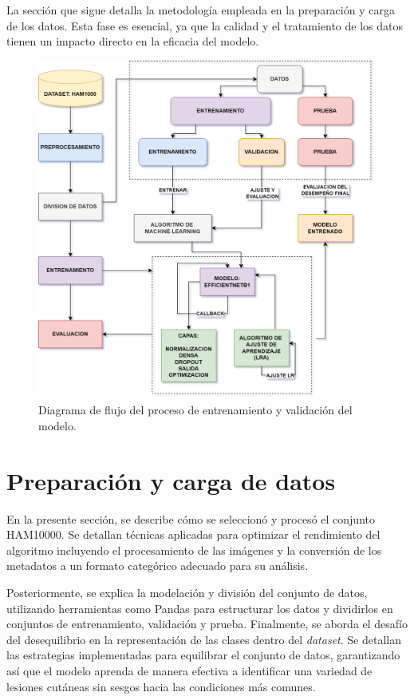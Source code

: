 La sección que sigue detalla la metodología empleada en la preparación y carga de los datos. Esta fase es esencial, ya que la calidad y el tratamiento de los datos tienen un impacto directo en la eficacia del modelo.

\begin{figure}[ht]%
   \begin{center}
   \includegraphics[width=1\textwidth]{./Graphics/model.png}
   \caption{Diagrama de flujo del proceso de entrenamiento  y validación del modelo.}
   \label{fig:model_structure}
   \end{center}
   \end{figure}

\section{Preparación y carga de datos}

En la presente sección, se describe cómo se seleccionó y procesó el conjunto HAM10000. Se detallan técnicas aplicadas para optimizar el rendimiento del algoritmo incluyendo el procesamiento de las imágenes y la conversión de los metadatos a un formato categórico adecuado para su análisis.

Posteriormente, se explica la modelación y división del conjunto de datos, utilizando herramientas como Pandas para estructurar los datos y dividirlos en conjuntos de entrenamiento, validación y prueba. Finalmente, se aborda el desafío del desequilibrio en la representación de las clases dentro del \textit{dataset}. Se detallan las estrategias implementadas para equilibrar el conjunto de datos, garantizando así que el modelo aprenda de manera efectiva a identificar una variedad de lesiones cutáneas sin sesgos hacia las condiciones más comunes.

